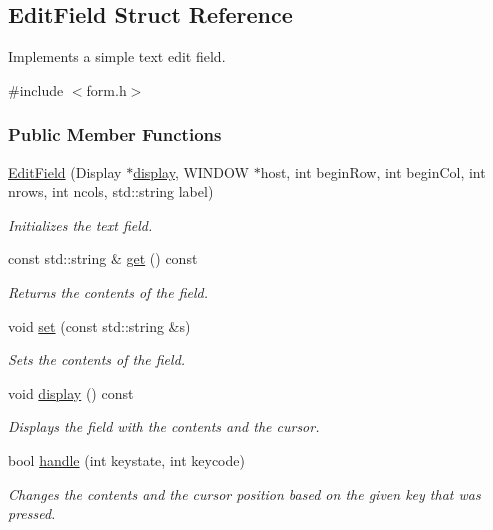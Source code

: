 \hypertarget{structEditField}{}\subsection{Edit\+Field Struct Reference}
\label{structEditField}


Implements a simple text edit field.  




{\ttfamily \#include $<$form.\+h$>$}

\subsubsection*{Public Member Functions}
\begin{DoxyCompactItemize}
\item 
\hyperlink{structEditField_a071f7fe0dc8eabb3790dc57d7683758e}{Edit\+Field} (Display $\ast$\hyperlink{structEditField_ae541ffacb0908d9dc97ee2784c0e83a5}{display}, W\+I\+N\+D\+OW $\ast$host, int begin\+Row, int begin\+Col, int nrows, int ncols, std\+::string label)
\begin{DoxyCompactList}\small\item\em Initializes the text field. \end{DoxyCompactList}\item 
const std\+::string \& \hyperlink{structEditField_a0c22da86ee658fc4e915e083486bed4b}{get} () const 
\begin{DoxyCompactList}\small\item\em Returns the contents of the field. \end{DoxyCompactList}\item 
void \hyperlink{structEditField_aa9f5add358af4c59d2cb442fd71a53f9}{set} (const std\+::string \&s)
\begin{DoxyCompactList}\small\item\em Sets the contents of the field. \end{DoxyCompactList}\item 
void \hyperlink{structEditField_ae541ffacb0908d9dc97ee2784c0e83a5}{display} () const \hypertarget{structEditField_ae541ffacb0908d9dc97ee2784c0e83a5}{}\label{structEditField_ae541ffacb0908d9dc97ee2784c0e83a5}

\begin{DoxyCompactList}\small\item\em Displays the field with the contents and the cursor. \end{DoxyCompactList}\item 
bool \hyperlink{structEditField_a091389ebd3dca82187ee2331fa127788}{handle} (int keystate, int keycode)
\begin{DoxyCompactList}\small\item\em Changes the contents and the cursor position based on the given key that was pressed. \end{DoxyCompactList}\end{DoxyCompactItemize}
